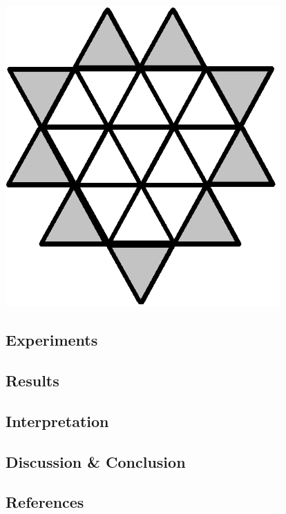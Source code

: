 \documentclass{article}
\newenvironment{Figure}
  {\par\medskip\noindent\minipage{\linewidth}}
  {\endminipage\par\medskip}
\begin{document}
\begin{multicols}{2}
\begin{Figure}
 \centering
 \includegraphics[width=0.79\textwidth]{imgs/extendedtriangle2.png}
\label{fig:exttriangle2std}
\end{Figure}

\subsection*{Experiments}
\subsection*{Results}
\subsection*{Interpretation}

\subsection*{Discussion \& Conclusion}

\subsection*{References}
\end{multicols}
\newpage


\end{document}
